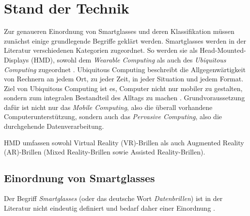 %
%
%
%
%
%
\chapter{Stand der Technik}
\label{sec:Stand_der_Technik}
Zur genaueren Einordnung von Smartglasses und deren Klassifikation müssen zunächst einige grundlegende Begriffe geklärt werden. Smartglasses werden in der Literatur verschiedenen Kategorien zugeordnet. So werden sie als Head-Mounted-Displays (HMD), sowohl dem \emph{Wearable Computing} als auch des \emph{Ubiquitous Computing} zugeordnet \cite[S.~20]{ThomasDirkMetzgerHelmutNiegemannHrsg2018}. Ubiquitous Computing beschreibt die Allgegenwärtigkeit von Rechnern an jedem Ort, zu jeder Zeit, in jeder Situation und jedem Format. Ziel von Ubiquitous Computing ist es, Computer nicht nur mobiler zu gestalten, sondern zum integralen Bestandteil des Alltags zu machen \cite[S.~24]{Schwenke2016}. Grundvoraussetzung dafür ist nicht nur das \emph{Mobile Computing}, also die überall vorhandene Computerunterstützung, sondern auch das \emph{Pervasive Computing}, also die durchgehende Datenverarbeitung. 

HMD umfassen sowohl Virtual Reality (VR)-Brillen als auch Augmented Reality (AR)-Brillen (Mixed Reality-Brillen sowie Assisted Reality-Brillen).
%
%
%
%
%
%
\section{Einordnung von Smartglasses}
\label{sec:Einordnung_von_Smartglasses}
Der Begriff \emph{Smartglasses} (oder das deutsche Wort \emph{Datenbrillen}) ist in der Literatur nicht eindeutig definiert und bedarf daher einer Einordnung \cite[S.~26]{Schwenke2016}. 

%
